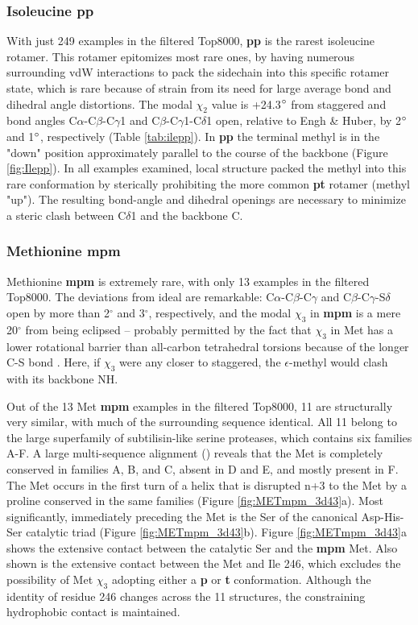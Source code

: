 \subsubsection{Isoleucine \textbf{pp}}
With just 249 examples in the filtered Top8000, \textbf{pp} is the rarest isoleucine rotamer. This rotamer epitomizes most rare ones, by having numerous surrounding vdW interactions to pack the sidechain into this specific rotamer state, which is rare because of strain from its need for large average bond and dihedral angle distortions. The modal $\chi_{2}$ value is +24.3$\degree$ from staggered and bond angles C$\alpha$-C$\beta$-C$\gamma$1 and C$\beta$-C$\gamma$1-C$\delta$1 open, relative to Engh \& Huber, by 2$\degree$ and 1$\degree$, respectively (Table \ref{tab:ilepp}). In \textbf{pp} the terminal methyl is in the "down" position approximately parallel to the course of the backbone (Figure \ref{fig:Ilepp}). In all examples examined, local structure packed the methyl into this rare conformation by sterically prohibiting the more common \textbf{pt} rotamer (methyl "up"). The resulting bond-angle and dihedral openings are necessary to minimize a steric clash between C$\delta$1 and the backbone C.

\subsubsection{Methionine \textbf{mpm}}
Methionine \textbf{mpm} is extremely rare, with only 13 examples in the filtered Top8000. The deviations from ideal are remarkable: C$\alpha$-C$\beta$-C$\gamma$ and C$\beta$-C$\gamma$-S$\delta$ open by more than 2$^\circ$ and 3$^\circ$, respectively, and the modal $\chi_{3}$ in \textbf{mpm} is a mere 20$^{\circ}$ from being eclipsed -- probably permitted by the fact that $\chi_{3}$ in Met has a lower rotational barrier than all-carbon tetrahedral torsions because of the longer C-S bond \cite{Butterfoss2003, Butterfoss2004}. Here, if $\chi_{3}$ were any closer to staggered, the $\epsilon$-methyl would clash with its backbone NH. 

Out of the 13 Met \textbf{mpm} examples in the filtered Top8000, 11 are structurally very similar, with much of the surrounding sequence identical. All 11 belong to the large superfamily of subtilisin-like serine proteases, which contains six families A-F. A large multi-sequence alignment (\cite{Siezen1997}) reveals that the Met is completely conserved in families A, B, and C, absent in D and E, and mostly present in F. The Met occurs in the first turn of a helix that is disrupted n+3 to the Met by a proline conserved in the same families (Figure \ref{fig:METmpm_3d43}a). Most significantly, immediately preceding the Met is the Ser of the canonical Asp-His-Ser catalytic triad (Figure \ref{fig:METmpm_3d43}b). Figure \ref{fig:METmpm_3d43}a shows the extensive contact between the catalytic Ser and the \textbf{mpm} Met. Also shown is the extensive contact between the Met and Ile 246, which excludes the possibility of Met $\chi_{3}$ adopting either a \textbf{p} or \textbf{t} conformation. Although the identity of residue 246 changes across the 11 structures, the constraining hydrophobic contact is maintained. 

